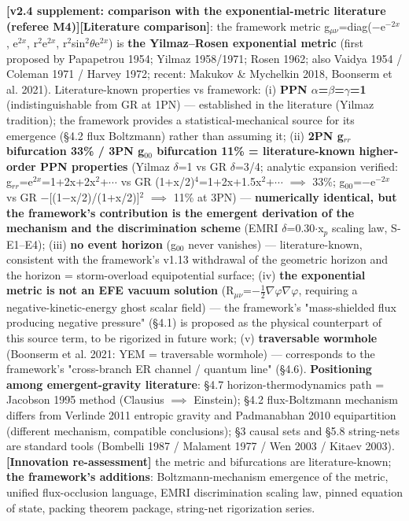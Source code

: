 \documentclass[12pt]{article}
\newcommand{\mtag}[1]{\textbf{[#1]}}
\newcommand{\up}[1]{\ensuremath{^{#1}}}
\newcommand{\down}[1]{\ensuremath{_{#1}}}
\begin{document}
\textbf{\mtag{v2.4 supplement: comparison with the exponential-metric literature (referee M4)}}\mtag{Literature comparison}: the framework metric g\down{\mu{}\nu{}}=diag(\ensuremath{-}e\up{-2x}, e\up{2x}, r\up{2}e\up{2x}, r\up{2}sin\up{2}\ensuremath{\theta}e\up{2x}) is \textbf{the Yilmaz--Rosen exponential metric} (first proposed by Papapetrou 1954; Yilmaz 1958/1971; Rosen 1962; also Vaidya 1954 / Coleman 1971 / Harvey 1972; recent: Makukov \& Mychelkin 2018, Boonserm et al. 2021). Literature-known properties vs framework: (i) \textbf{PPN \ensuremath{\alpha}=\ensuremath{\beta}=\ensuremath{\gamma}=1} (indistinguishable from GR at 1PN) --- established in the literature (Yilmaz tradition); the framework provides a statistical-mechanical source for its emergence (\S{}4.2 flux Boltzmann) rather than assuming it; (ii) \textbf{2PN g\down{rr} bifurcation 33\% / 3PN g\down{00} bifurcation 11\% = literature-known higher-order PPN properties} (Yilmaz \ensuremath{\delta}=1 vs GR \ensuremath{\delta}=3/4; analytic expansion verified: g\down{rr}=e\up{2x}=1+2x+2x\up{2}+\ensuremath{\cdots} vs GR (1+x/2)\up{4}=1+2x+1.5x\up{2}+\ensuremath{\cdots} \ensuremath{\implies} 33\%; g\down{00}=\ensuremath{-}e\up{-2x} vs GR \ensuremath{-}[(1\ensuremath{-}x/2)/(1+x/2)]\up{2} \ensuremath{\implies} 11\% at 3PN) --- \textbf{numerically identical, but the framework's contribution is the emergent derivation of the mechanism and the discrimination scheme} (EMRI \ensuremath{\delta}=0.30\ensuremath{\cdot}x\down{p} scaling law, S-E1--E4); (iii) \textbf{no event horizon} (g\down{00} never vanishes) --- literature-known, consistent with the framework's v1.13 withdrawal of the geometric horizon and the horizon = storm-overload equipotential surface; (iv) \textbf{the exponential metric is not an EFE vacuum solution} (R\down{\mu{}\nu{}}=\ensuremath{-}\ensuremath{\tfrac12}\ensuremath{\nabla}\ensuremath{\varphi}\ensuremath{\nabla}\ensuremath{\varphi}, requiring a negative-kinetic-energy ghost scalar field) --- the framework's "mass-shielded flux producing negative pressure" (\S{}4.1) is proposed as the physical counterpart of this source term, to be rigorized in future work; (v) \textbf{traversable wormhole} (Boonserm et al. 2021: YEM = traversable wormhole) --- corresponds to the framework's "cross-branch ER channel / quantum line" (\S{}4.6). \textbf{Positioning among emergent-gravity literature}: \S{}4.7 horizon-thermodynamics path = Jacobson 1995 method (Clausius \ensuremath{\implies} Einstein); \S{}4.2 flux-Boltzmann mechanism differs from Verlinde 2011 entropic gravity and Padmanabhan 2010 equipartition (different mechanism, compatible conclusions); \S{}3 causal sets and \S{}5.8 string-nets are standard tools (Bombelli 1987 / Malament 1977 / Wen 2003 / Kitaev 2003). \mtag{Innovation re-assessment} the metric and bifurcations are literature-known; \textbf{the framework's additions}: Boltzmann-mechanism emergence of the metric, unified flux-occlusion language, EMRI discrimination scaling law, pinned equation of state, packing theorem package, string-net rigorization series.
\end{document}
